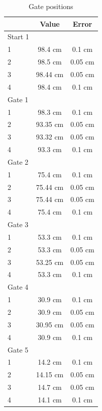 \documentclass[a4paper,%
               aps,%
               prl,%
               amsfonts,%
               amssymb,%
               amsmath,%
               nobibnotes,%
               twocolumn, %
               twoside,%
               balancelastpage,%
               eqsecnum] %
               {revtex4-1}
\begin{document}
\begin{table}[H]
    \centering
    \begin{tabular}{lcc}
    \hline
    &Value &Error\\
    \hline
    \hline
    Start 1&&\\
    \hline
     1 & 98.4 cm & 0.1 cm \\
     2 & 98.5 cm & 0.05 cm \\
     3 & 98.44 cm & 0.05 cm \\
     4 & 98.4 cm & 0.1 cm\\
    \hline
    \hline
    Gate 1&&\\
    \hline
     1 & 98.3 cm & 0.1 cm \\
     2 & 93.35 cm & 0.05 cm \\
     3 & 93.32 cm & 0.05 cm \\
     4 & 93.3 cm & 0.1 cm\\
     \hline
     \hline
     Gate 2&&\\
     \hline
     1 & 75.4 cm & 0.1 cm \\
     2 & 75.44 cm & 0.05 cm \\
     3 & 75.44 cm & 0.05 cm \\
     4 & 75.4 cm & 0.1 cm\\
     \hline
     \hline
     Gate 3&&\\
     \hline
     1 & 53.3 cm & 0.1 cm \\
     2 & 53.3 cm & 0.05 cm \\
     3 & 53.25 cm & 0.05 cm \\
     4 & 53.3 cm & 0.1 cm\\
     \hline
     \hline
     Gate 4&&\\
     \hline
     1 & 30.9 cm & 0.1 cm \\
     2 & 30.9 cm & 0.05 cm \\
     3 & 30.95 cm & 0.05 cm \\
     4 & 30.9 cm & 0.1 cm\\
     \hline
     \hline
     Gate 5&&\\
     \hline
     1 & 14.2 cm & 0.1 cm \\
     2 & 14.15 cm & 0.05 cm \\
     3 & 14.7 cm & 0.05 cm \\
     4 & 14.1 cm & 0.1 cm\\
     \hline
    \end{tabular}
    \caption{Gate positions}
    \label{tab:my_label}
\end{table}
\end{document}
